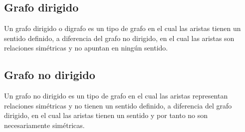 \subsection{Grafo dirigido}

Un grafo dirigido o digrafo es un tipo de grafo en el cual las aristas tienen un sentido definido, a 
diferencia del grafo no dirigido, en el cual las aristas son relaciones simétricas y no apuntan en ningún 
sentido.

\subsection{Grafo no dirigido}

Un grafo no dirigido es un tipo de grafo en el cual las aristas representan relaciones simétricas y no tienen un sentido definido, a diferencia del grafo dirigido, en el cual las aristas tienen un sentido y por tanto no son necesariamente simétricas. 